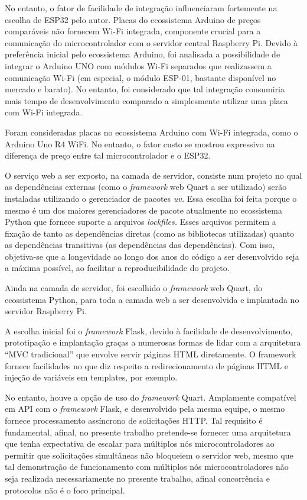No entanto, o fator de facilidade de integração influenciaram fortemente na escolha de ESP32 pelo autor. Placas do ecossistema Arduino de preços comparáveis não fornecem Wi-Fi integrada, componente crucial para a comunicação do microcontrolador com o servidor central Raspberry Pi. Devido à preferência inicial pelo ecossistema Arduino, foi analisada a possibilidade de integrar o Arduino UNO com módulos Wi-Fi separados que realizassem a comunicação Wi-Fi (em especial, o módulo ESP-01, bastante disponível no mercado e barato). No entanto, foi considerado que tal integração consumiria mais tempo de desenvolvimento comparado a simplesmente utilizar uma placa com Wi-Fi integrada.

Foram consideradas placas no ecossistema Arduino com Wi-Fi integrada, como o Arduino Uno R4 WiFi. No entanto, o fator custo se mostrou expressivo na diferença de preço entre tal microcontrolador e o ESP32.


O serviço web a ser exposto, na camada de servidor, consiste num projeto no qual as dependências externas (como o \textit{framework} web Quart a ser utilizado) serão instaladas utilizando o gerenciador de pacotes \textit{uv.} Essa escolha foi feita porque o mesmo é um dos maiores gerenciadores de pacote atualmente no ecossistema Python que fornece suporte a arquivos \textit{lockfiles.} Esses arquivos permitem a fixação de tanto as dependências diretas (como as bibliotecas utilizadas) quanto as dependências transitivas (as dependências das dependências). Com isso, objetiva-se que a longevidade ao longo dos anos do código a ser desenvolvido seja a máxima possível, ao facilitar a reproducibilidade do projeto.

Ainda na camada de servidor, foi escolhido o \textit{framework} web Quart, do ecossistema Python, para toda a camada web a ser desenvolvida e implantada no servidor Raspberry Pi.

A escolha inicial foi o \textit{framework} Flask, devido à facilidade de desenvolvimento, prototipação e implantação graças a numerosas formas de lidar com a arquitetura ``MVC tradicional'' que envolve servir páginas HTML diretamente. O framework fornece facilidades no que diz respeito a redirecionamento de páginas HTML e injeção de variáveis em templates, por exemplo.

No entanto, houve a opção de uso do \textit{framework} Quart. Amplamente compatível em API com o \textit{framework} Flask, e desenvolvido pela mesma equipe, o mesmo fornece processamento assíncrono de solicitações HTTP. Tal requisito é fundamental, afinal, no presente trabalho pretende-se fornecer uma arquitetura que tenha expectativa de escalar para múltiplos nós microcontroladores ao permitir que solicitações simultâneas não bloqueiem o servidor web, mesmo que tal demonstração de funcionamento com múltiplos nós microcontroladores não seja realizada necessariamente no presente trabalho, afinal concorrência e protocolos não é o foco principal.

